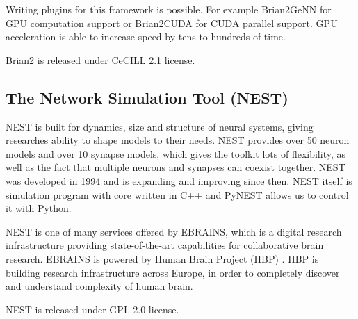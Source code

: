 Writing plugins for this framework is possible. For example Brian2GeNN \cite{brian2genn} for GPU computation support or Brian2CUDA \cite{brian2cuda} for CUDA parallel support. GPU acceleration is able to increase speed by tens to hundreds of time.

Brian2 is released under CeCILL 2.1 license.


\subsection{The Network Simulation Tool (NEST)}%
\label{sub:the_network_simulation_tool_nest}

NEST is built for dynamics, size and structure of neural systems, giving researches ability to shape models to their needs. NEST provides over 50 neuron models and over 10 synapse models, which gives the toolkit lots of flexibility, as well as the fact that multiple neurons and synapses can coexist together. NEST was developed in 1994 and is expanding and improving since then. NEST itself is simulation program with core written in C++ and PyNEST allows us to control it with Python. \cite{nest-site, nest}

NEST is one of many services offered by EBRAINS, which is a digital research infrastructure providing state-of-the-art capabilities for collaborative brain research. \cite{ebrains} EBRAINS is powered by Human Brain Project (HBP) \cite{hbp}. HBP is building research infrastructure across Europe, in order to completely discover and understand complexity of human brain.

NEST is released under GPL-2.0 license.

